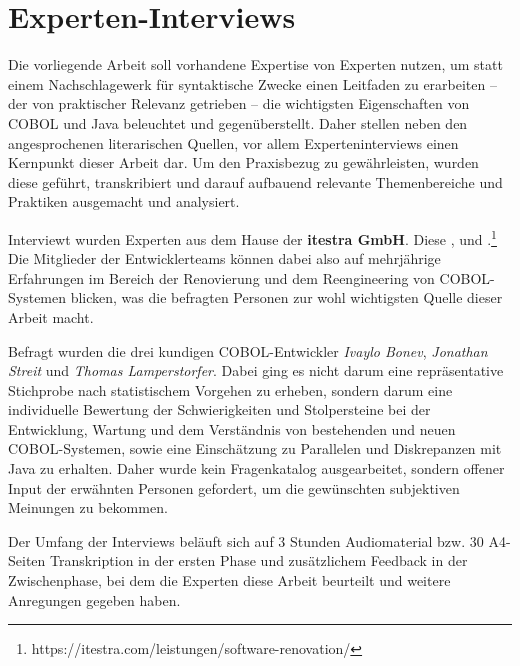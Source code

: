 \section{Experten-Interviews}\label{interviews}
Die vorliegende Arbeit soll vorhandene Expertise von Experten nutzen, um statt einem Nachschlagewerk für syntaktische Zwecke einen Leitfaden zu erarbeiten -- der von praktischer Relevanz getrieben -- die wichtigsten Eigenschaften von COBOL und Java beleuchtet und gegenüberstellt. Daher stellen neben den angesprochenen literarischen Quellen, vor allem Experteninterviews einen Kernpunkt dieser Arbeit dar. Um den Praxisbezug zu gewährleisten, wurden diese geführt, transkribiert und darauf aufbauend relevante Themenbereiche und Praktiken ausgemacht und analysiert.

Interviewt wurden Experten aus dem Hause der \textbf{itestra GmbH}. Diese ,  und .\footnote{\label{itestraFootnote}https://itestra.com/leistungen/software-renovation/} Die Mitglieder der Entwicklerteams können dabei also auf mehrjährige Erfahrungen im Bereich der Renovierung und dem Reengineering von COBOL-Systemen blicken, was die befragten Personen zur wohl wichtigsten Quelle dieser Arbeit macht.

Befragt wurden die drei kundigen COBOL-Entwickler \textit{Ivaylo Bonev}, \textit{Jonathan Streit} und \textit{Thomas Lamperstorfer}. Dabei ging es nicht darum eine repräsentative Stichprobe nach statistischem Vorgehen zu erheben, sondern darum eine individuelle Bewertung der Schwierigkeiten und Stolpersteine bei der Entwicklung, Wartung und dem Verständnis von bestehenden und neuen COBOL-Systemen, sowie eine Einschätzung zu Parallelen und Diskrepanzen mit Java zu erhalten. Daher wurde kein Fragenkatalog ausgearbeitet, sondern offener Input der erwähnten Personen gefordert, um die gewünschten subjektiven Meinungen zu bekommen. 

Der Umfang der Interviews beläuft sich auf 3 Stunden Audiomaterial bzw. 30 A4-Seiten Transkription in der ersten Phase und zusätzlichem Feedback in der Zwischenphase, bei dem die Experten diese Arbeit beurteilt und weitere Anregungen gegeben haben.